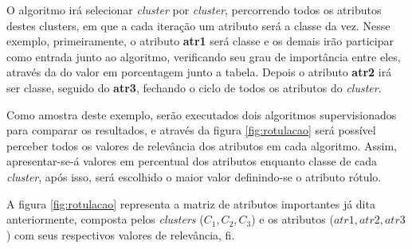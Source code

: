 O algoritmo irá selecionar \textit{cluster} por \textit{cluster}, percorrendo todos os atributos destes clusters, em que a cada iteração um atributo será a classe da vez. Nesse exemplo, primeiramente, o atributo \textbf{atr1} será classe e os demais irão participar como entrada junto ao algoritmo, verificando seu grau de importância entre eles, através da do valor em porcentagem junto a tabela. Depois o atributo \textbf{atr2} irá ser classe, seguido do \textbf{atr3}, fechando o ciclo de todos os atributos do \textit{cluster}.

Como amostra deste exemplo, serão executados dois algoritmos supervisionados para comparar os resultados, e através da figura \ref{fig:rotulacao} será possível perceber todos os valores de relevância dos atributos em cada algoritmo. Assim, apresentar-se-á valores em percentual dos atributos enquanto classe de cada \textit{cluster}, após isso, será escolhido o maior valor definindo-se o atributo rótulo. 

A figura \ref{fig:rotulacao} representa a matriz de atributos importantes já dita anteriormente, composta pelos \textit{clusters} (${C_1,C_2,C_3}$) e os atributos (${atr1,atr2,atr3}$) com seus respectivos valores de relevância, fi.



